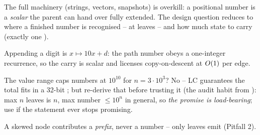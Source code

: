 The full  machinery (strings, vectors, snapshots) is
overkill: a positional number is a \emph{scalar} the parent can hand over fully
extended. The design question reduces to where a finished number is recognised
-- at leaves -- and how much state to carry (exactly one ).

\begin{observation}
Appending a digit is $x \mapsto 10x + d$: the path number obeys a
one-integer recurrence, so the carry is scalar and
 licenses copy-on-descent at $O(1)$ per edge.
\end{observation}
\begin{observation}
The value range caps numbers at $10^{10}$ for $n = 3\cdot10^{3}$? No -- LC
guarantees the total fits in a 32-bit ; but re-derive that before
trusting it (the audit habit from ): max $n$ leaves is
$n$, max number $\le 10^{n}$ in general, so \emph{the promise is load-bearing};
use  if the statement ever stops promising.
\end{observation}
\begin{observation}
A skewed node contributes a \emph{prefix}, never a number -- only
 leaves emit (Pitfall 2).
\end{observation}

\begin{thinkbox}
\end{thinkbox}

